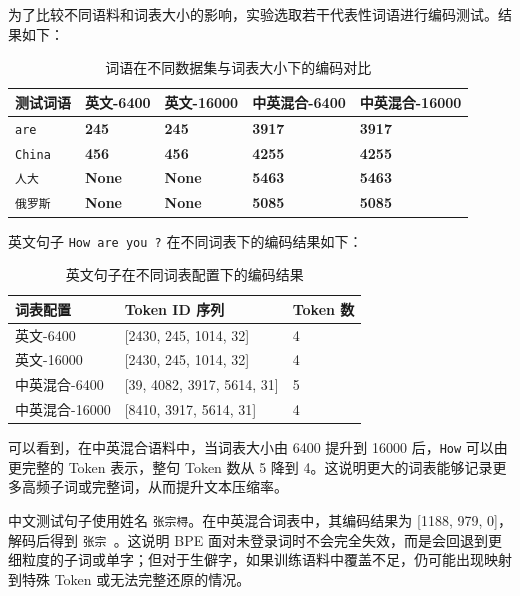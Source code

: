 \documentclass[a4paper,12pt]{ctexart}
\begin{document}
为了比较不同语料和词表大小的影响，实验选取若干代表性词语进行编码测试。结果如下：

\begin{table}[H]
    \centering
    \begin{tabularx}{\textwidth}{L{0.16\textwidth}L{0.19\textwidth}L{0.19\textwidth}L{0.19\textwidth}L{0.19\textwidth}}
        \toprule
        测试词语 & 英文-6400 & 英文-16000 & 中英混合-6400 & 中英混合-16000 \\
        \midrule
        \texttt{are} & \textbf{245} & \textbf{245} & \textbf{3917} & \textbf{3917} \\
        \texttt{China} & \textbf{456} & \textbf{456} & \textbf{4255} & \textbf{4255} \\
        \texttt{人大} & \textbf{None} & \textbf{None} & \textbf{5463} & \textbf{5463} \\
        \texttt{俄罗斯} & \textbf{None} & \textbf{None} & \textbf{5085} & \textbf{5085} \\
        \bottomrule
    \end{tabularx}
    \caption{词语在不同数据集与词表大小下的编码对比}
\end{table}

英文句子 \texttt{How are you ?} 在不同词表下的编码结果如下：

\begin{table}[H]
    \centering
    \begin{tabularx}{\textwidth}{L{0.24\textwidth}Y L{0.14\textwidth}}
        \toprule
        词表配置 & Token ID 序列 & Token 数 \\
        \midrule
        英文-6400 & [2430, 245, 1014, 32] & 4 \\
        英文-16000 & [2430, 245, 1014, 32] & 4 \\
        中英混合-6400 & [39, 4082, 3917, 5614, 31] & 5 \\
        中英混合-16000 & [8410, 3917, 5614, 31] & 4 \\
        \bottomrule
    \end{tabularx}
    \caption{英文句子在不同词表配置下的编码结果}
\end{table}

可以看到，在中英混合语料中，当词表大小由 6400 提升到 16000 后，\texttt{How} 可以由更完整的 Token 表示，整句 Token 数从 5 降到 4。这说明更大的词表能够记录更多高频子词或完整词，从而提升文本压缩率。

中文测试句子使用姓名 \texttt{张宗桪}。在中英混合词表中，其编码结果为 [1188, 979, 0]，解码后得到 \texttt{张宗 }。这说明 BPE 面对未登录词时不会完全失效，而是会回退到更细粒度的子词或单字；但对于生僻字，如果训练语料中覆盖不足，仍可能出现映射到特殊 Token 或无法完整还原的情况。
\end{document}
